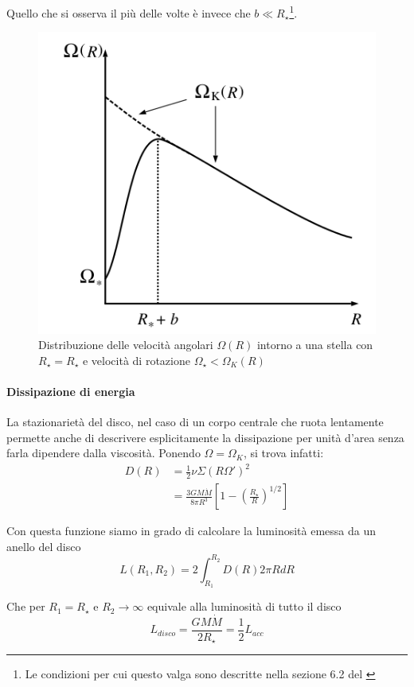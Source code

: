 \documentclass[a4paperbi]{article}
\begin{document}
	Quello che si osserva il più delle volte è invece che $b\ll R_{\star}$\footnote{Le condizioni per cui questo valga sono descritte nella sezione 6.2 del \cite{FrankKingRaineAccretionPower}}.	
	
	\begin{figure}[H]
		\centering
		\includegraphics[width=0.7\linewidth]{InnerRegionAngularVelocity}
		\caption{Distribuzione delle velocità angolari $\Omega(R)$ intorno a una stella con $R_{\star}=R_\star$ e velocità di rotazione $\Omega_{\star}<\Omega_K(R)$}
		\label{fig:InnerRegionAngularVelocity}
	\end{figure}
	
	\paragraph{Dissipazione di energia}
	La stazionarietà del disco, nel caso di un corpo centrale che ruota lentamente permette anche di descrivere esplicitamente la dissipazione per unità d'area senza farla dipendere dalla viscosità. Ponendo $\Omega=\Omega_K$, si trova infatti:
	\begin{align}
		D(R)&=\frac{1}{2}\nu\Sigma(R\Omega')^2
			\\&=\frac{3GM\dot{M}}{8\pi R^3}\left[1-\left(\frac{R_{\star}}{R}\right)^{1/2}\right]
	\end{align}	
	
	Con questa funzione siamo in grado di calcolare la luminosità emessa da un anello del disco
	\begin{equation}
		L(R_1,R_2)=2\int_{R_1}^{R_2}D(R)2\pi RdR
	\end{equation}
	
	Che per $R_1=R_{\star}$ e $R_2\to\infty$ equivale alla luminosità di tutto il disco
	\begin{equation}
		L_{disco}=\frac{GM\dot{M}}{2R_{\star}}=\frac{1}{2}L_{acc}
	\end{equation}
	
\end{document}
